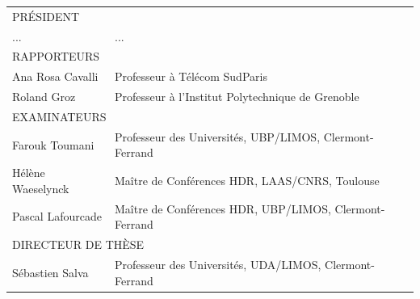 \begin{titlepage}
    \begin{tabular}{l l}
    \multicolumn{2}{l}{\uppercase{Président}}\\
    ... & ... \\
    \multicolumn{2}{l}{\uppercase{Rapporteurs}}\\
    Ana Rosa Cavalli & Professeur à Télécom SudParis\\
    Roland Groz & Professeur à l'Institut Polytechnique de Grenoble\\
    \multicolumn{2}{l}{\uppercase{Examinateurs}}\\
    Farouk Toumani & Professeur des Universités, UBP/LIMOS, Clermont-Ferrand\\
    Hélène Waeselynck & Maître de Conférences HDR, LAAS/CNRS, Toulouse\\
    Pascal Lafourcade & Maître de Conférences HDR, UBP/LIMOS, Clermont-Ferrand\\
    \multicolumn{2}{l}{\uppercase{Directeur de thèse}}\\
    S\'ebastien Salva & Professeur des Universités, UDA/LIMOS, Clermont-Ferrand\\
    \end{tabular}

\end{titlepage}
